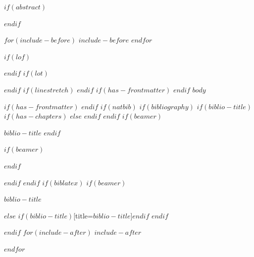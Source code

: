 \documentclass[12pt,a4paper]{article}
\newcounter{none}               %
\newif\ifbibliography
\begin{document}
$if(abstract)$
\begin{abstract}
$abstract$
\end{abstract}
$endif$

$for(include-before)$
$include-before$
$endfor$

\tableofcontents
\clearpage

$if(lof)$
\listoffigures
$endif$
$if(lot)$
\listoftables
$endif$
$if(linestretch)$
$endif$
$if(has-frontmatter)$
\mainmatter
$endif$
$body$

$if(has-frontmatter)$
\backmatter
$endif$
$if(natbib)$
$if(bibliography)$
$if(biblio-title)$
$if(has-chapters)$
\renewcommand\bibname{$biblio-title$}
$else$
\renewcommand\refname{$biblio-title$}
$endif$
$endif$
$if(beamer)$
\begin{frame}[allowframebreaks]{$biblio-title$}
  \bibliographytrue
$endif$
  
$if(beamer)$
\end{frame}
$endif$

$endif$
$endif$
$if(biblatex)$
$if(beamer)$
\begin{frame}[allowframebreaks]{$biblio-title$}
  \bibliographytrue
  \printbibliography[heading=none]
\end{frame}
$else$
\printbibliography$if(biblio-title)$[title=$biblio-title$]$endif$
$endif$

$endif$
$for(include-after)$
$include-after$

$endfor$
\end{document}
